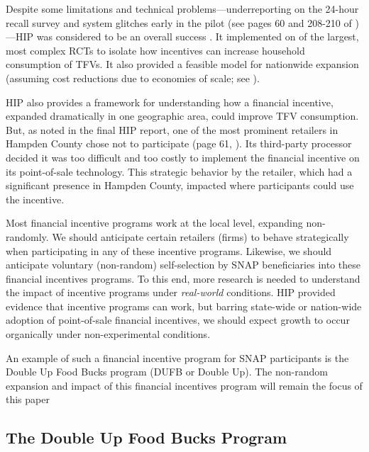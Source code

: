 \documentclass[12pt,letterpaperpaper,]{book}
\begin{document}
Despite some limitations and technical problems---underreporting on the
24-hour recall survey and system glitches early in the pilot (see pages
60 and 208-210 of \citet{bartlett_evaluation_2014})---HIP was considered
to be an overall success
\citep{klerman_short-run_2014, olsho_financial_2016}. It implemented on
of the largest, most complex RCTs to isolate how incentives can increase
household consumption of TFVs. It also provided a feasible model for
nationwide expansion (assuming cost reductions due to economies of
scale; see \citet{an_nationwide_2015}).

HIP also provides a framework for understanding how a financial
incentive, expanded dramatically in one geographic area, could improve
TFV consumption. But, as noted in the final HIP report, one of the most
prominent retailers in Hampden County chose not to participate (page 61,
\citet{bartlett_evaluation_2014}). Its third-party processor decided it
was too difficult and too costly to implement the financial incentive on
its point-of-sale technology. This strategic behavior by the retailer,
which had a significant presence in Hampden County, impacted where
participants could use the incentive.

Most financial incentive programs work at the local level, expanding
non-randomly. We should anticipate certain retailers (firms) to behave
strategically when participating in any of these incentive programs.
Likewise, we should anticipate voluntary (non-random) self-selection by
SNAP beneficiaries into these financial incentives programs. To this
end, more research is needed to understand the impact of incentive
programs under \emph{real-world} conditions. HIP provided evidence that
incentive programs can work, but barring state-wide or nation-wide
adoption of point-of-sale financial incentives, we should expect growth
to occur organically under non-experimental conditions.

An example of such a financial incentive program for SNAP participants
is the Double Up Food Bucks program (DUFB or Double Up). The non-random
expansion and impact of this financial incentives program will remain
the focus of this paper

\subsection*{The Double Up Food Bucks
Program}\label{the-double-up-food-bucks-program}
\end{document}
